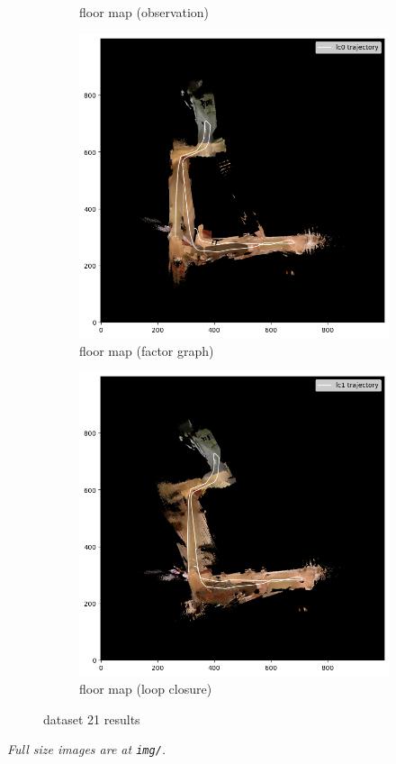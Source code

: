 \documentclass[conference]{IEEEtran}
\begin{document}
\begin{figure}
\begin{subfigure}{0.24\textwidth}
        \caption{floor map (observation)}
        \label{fig:fmap_21_icp}
    \end{subfigure}
    \hfill
    \begin{subfigure}{0.24\textwidth}
        \includegraphics[width=\linewidth]{../img/fmap_21_lc0.png}
        \caption{floor map (factor graph)}
        \label{fig:fmap_21_lc0}
    \end{subfigure}
    \hfill
    \begin{subfigure}{0.24\textwidth}
        \includegraphics[width=\linewidth]{../img/fmap_21_lc1.png}
        \caption{floor map (loop closure)}
        \label{fig:fmap_21_lc1}
    \end{subfigure}
    
    \caption{dataset 21 results}
    \label{fig:dataset21}
\end{figure}
\textit{Full size images are at \texttt{img/}.}
\end{document}
